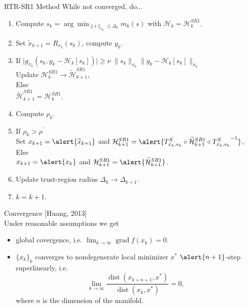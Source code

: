 \documentclass{beamer}
\begin{document}
\begin{frame}{RTR-SR1 Method}
    While not converged, do... 

    \begin{enumerate}
        \item Compute $s_k = \arg \min_{\lVert s \rVert_{x_k} \leq \Delta_k} m_k( s )$ with $\mathcal{H}_k = \mathcal{H}^{SR1}_k$.
        \item Set $\widetilde{x}_{k+1} = R_{x_k}(s_k)$, compute $y_k$.
        \item If $\lvert g_{x_k}(s_k, y_k - \mathcal{H}_k[s_k]) \rvert \geq \nu \; \lVert s_k \rVert_{x_k} \lVert y_k - \mathcal{H}_k[s_k] \rVert_{x_k}$ \\
        \hspace{10mm} Update $\mathcal{H}^{SR1}_k \rightarrow \widetilde{\mathcal{H}}^{SR1}_{k+1}$, \\
        Else \\
        \hspace{10mm} $\widetilde{\mathcal{H}}^{SR1}_{k+1} = \mathcal{H}^{SR1}_{k}$. 
        \item Compute $\rho_k$.
        \item If $\rho_k > \rho^{\prime}$ \\
        \hspace{10mm} Set $x_{k+1} = \alert{\widetilde{x}_{k+1}}$ and $\mathcal{H}^{SR1}_{k+1} = \alert{T^{S}_{x_k, s_k} \circ \widetilde{\mathcal{H}}^{SR1}_{k+1} \circ  {T^{S}_{x_k, s_k}}^{-1}}$, \\
        Else \\
        \hspace{10mm} $x_{k+1} = \alert{x_k}$ and $\mathcal{H}^{SR1}_{k+1} = \alert{\widetilde{\mathcal{H}}^{SR1}_{k+1}}$.
        \item Update trust-region radius $\Delta_k \rightarrow \Delta_{k+1}$.
        \item $k = k+1$.
    \end{enumerate}
\end{frame}

\begin{frame}{Convergence}
    \vspace{-1\baselineskip}\hfill{\tiny{[Huang, 2013]}} \\[0.2\baselineskip]
    Under reasonable assumptions we get 
    \begin{itemize}
        \item \alert{global covergence}, i.e. $\lim_{k \rightarrow \infty} \operatorname{grad} f(x_k) = 0$.
        \item $\{ x_k \}_k$ converges to nondegenerate local minimizer $x^*$ $\alert{n + 1}$\alert{-step superlinearly}, i.e. \begin{equation*}\lim_{k \rightarrow \infty} \frac{\operatorname{dist}(x_{k+n+1}, x^*)}{\operatorname{dist}(x_k, x^*)} = 0, \end{equation*} where $n$ is the dimension of the manifold.
    \end{itemize}
\end{frame}
\end{document}
